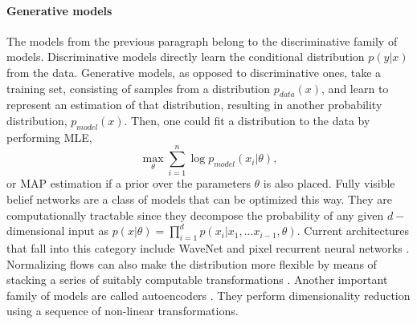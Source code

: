 \paragraph{Generative models} 
The models from the previous paragraph belong to the discriminative family of models. Discriminative models directly learn the conditional distribution $p(y|x)$ from the data.
Generative models, as opposed to discriminative ones, take a training set, consisting of samples from a distribution $p_{data}(x)$, and learn to represent an estimation of that distribution, resulting in another probability distribution, $p_{model}(x)$. Then, one could fit a distribution to the data by performing MLE,
$$
\max_{\theta} \sum_{i=1}^n \log p_{model} (x_i | \theta),
$$
or MAP estimation if a prior over the parameters $\theta$ is also placed. Fully visible belief networks \parencite{10.5555/2998828.2998922} are a class of models that can be optimized this way. They are computationally tractable since they decompose the probability of any given $d-$dimensional input as $p(x | \theta) = \prod_{i=1}^d p(x_i | x_1 , \ldots x_{i-1}, \theta)$. Current architectures that fall into this category include WaveNet \parencite{oord2016wavenet} and pixel recurrent neural networks \parencite{pmlr-v48-oord16}. Normalizing flows can also make the distribution more flexible by means of stacking a series of suitably computable transformations \parencite{pmlr-v37-rezende15}.
Another important family of models are called autoencoders \parencite{autoencoders,kingma2013auto}. They perform dimensionality reduction 
using a sequence of non-linear transformations.

